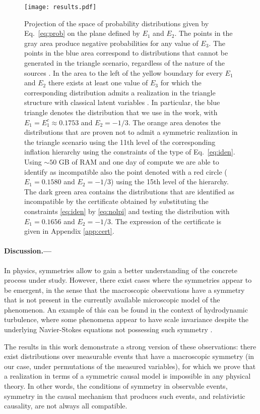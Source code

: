 \documentclass[aps,physrev,reprint,superscriptaddress,nofootinbib,twocolumn]{revtex4-2}
\begin{document}
\begin{figure}
    \centering
    \texttt{[image: results.pdf]}
    \caption{Projection of the space of probability distributions given by Eq.~\eqref{eq:prob} on the plane defined by $E_1$ and $E_2$.
    The points in the gray area produce negative probabilities for any value of $E_3$.
    The points in the blue area correspond to distributions that cannot be generated in the triangle scenario, regardless of the nature of the sources \cite{gisin2020}.
    In the area to the left of the yellow boundary for every $E_1$ and $E_2$ there exists at least one value of $E_3$ for which the corresponding distribution admits a realization in the triangle structure with classical latent variables \cite{gisin2020}.
    In particular, the blue triangle denotes the distribution that we use in the work, with $E_1=E_1^c\approx0.1753$ and $E_2=-1/3$.
    The orange area denotes the distributions that are proven not to admit a symmetric realization in the triangle scenario using the 11th level of the corresponding inflation hierarchy using the constraints of the type of Eq.~\eqref{eq:iden}.
    Using $\sim50$ GB of RAM and one day of compute we are able to identify as incompatible also the point denoted with a red circle ($E_1=0.1580$ and $E_2=-1/3$) using the 15th level of the hierarchy.
    The dark green area contains the distributions that are identified as incompatible by the certificate obtained by substituting the constraints \eqref{eq:iden} by \eqref{eq:nolpi} and testing the distribution with $E_1=0.1656$ and $E_2=-1/3$.
    The expression of the certificate is given in Appendix \ref{app:cert}.
    }
    \label{fig:results}
\end{figure}

\paragraph*{Discussion.---}
In physics, symmetries allow to gain a better understanding of the concrete process under study.
However, there exist cases where the symmetries appear to be emergent, in the sense that the macroscopic observations have a symmetry that is not present in the currently available microscopic model of the phenomenon.
An example of this can be found in the context of hydrodynamic turbulence, where some phenomena appear to have scale invariance despite the underlying Navier-Stokes equations not possessing such symmetry \cite{frisch1995turbulence,shavit2022}.

The results in this work demonstrate a strong version of these observations: there exist distributions over measurable events that have a macroscopic symmetry (in our case, under permutations of the measured variables), for which we prove that a realization in terms of a symmetric causal model is impossible in any physical theory.
In other words, the conditions of symmetry in observable events, symmetry in the causal mechanism that produces such events, and relativistic causality, are not always all compatible.
\end{document}

